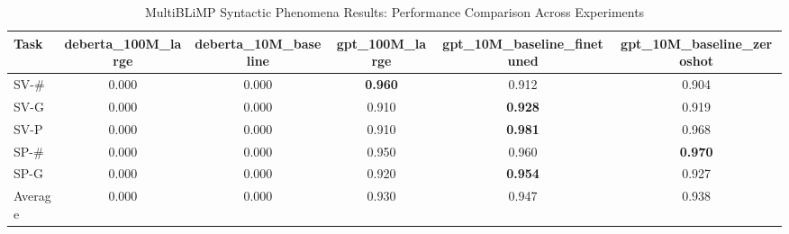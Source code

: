 \begin{table}[htbp]
\centering
\caption{MultiBLiMP Syntactic Phenomena Results: Performance Comparison Across Experiments}
\label{tab:multiblimp_results}
\begin{tabular}{lccccc}
\toprule
Task & deberta_100M_large & deberta_10M_baseline & gpt_100M_large & gpt_10M_baseline_finetuned & gpt_10M_baseline_zeroshot \\
\midrule
SV-# & 0.000 & 0.000 & \textbf{0.960} & 0.912 & 0.904 \\
SV-G & 0.000 & 0.000 & 0.910 & \textbf{0.928} & 0.919 \\
SV-P & 0.000 & 0.000 & 0.910 & \textbf{0.981} & 0.968 \\
SP-# & 0.000 & 0.000 & 0.950 & 0.960 & \textbf{0.970} \\
SP-G & 0.000 & 0.000 & 0.920 & \textbf{0.954} & 0.927 \\
\midrule
Average & 0.000 & 0.000 & 0.930 & 0.947 & 0.938 \\
\bottomrule
\end{tabular}
\end{table}
